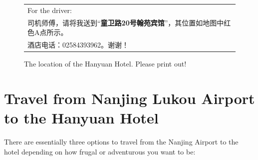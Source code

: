 \documentclass[11pt]{report}
\begin{document}
\begin{figure}[p]
\begin{tabular}{l}
For the driver:\medskip\\

司机师傅，请将我送到``{\bf 童卫路20号翰苑宾馆}''，其位置如地图中红色A点所示。\\
酒店电话：02584393962。谢谢！
\end{tabular}

\begin{center}
\end{center}
\caption{The location of the Hanyuan Hotel. Please print out!
\label{hanyuan}} 
\end{figure}
 


\section{Travel from Nanjing Lukou Airport to the Hanyuan Hotel}

There are essentially three options to travel from the Nanjing
Airport to the hotel depending on how frugal or adventurous
you want to be:
\end{document}
